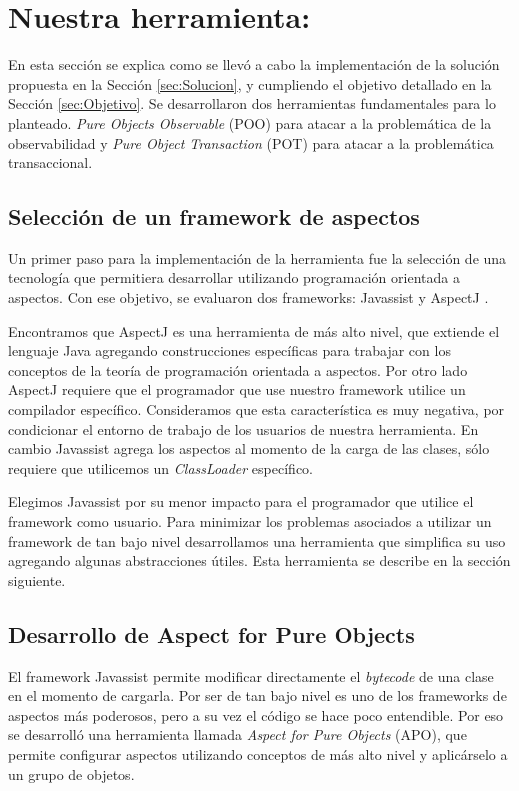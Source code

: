 \section{Nuestra herramienta: }

En esta sección se explica como se llevó a cabo la implementación de la solución
propuesta en la Sección \ref{sec:Solucion}, y cumpliendo el objetivo detallado
en la Sección \ref{sec:Objetivo}. Se desarrollaron dos herramientas
fundamentales para lo planteado. \emph{Pure Objects Observable} (POO) para atacar a la
problemática de la observabilidad y \emph{Pure Object Transaction} (POT) para
atacar a la problemática transaccional.
	
	\subsection{Selección de un framework de aspectos}  
	Un primer paso para la implementación de la herramienta fue la selección de una
	tecnología que permitiera desarrollar utilizando programación orientada a
	aspectos.
	Con ese objetivo, se evaluaron dos frameworks: Javassist \cite{??} y AspectJ
	\cite{KiczalesHHKPG01}.

	\medskip 
	Encontramos que AspectJ es una herramienta de más alto nivel, que extiende
	el lenguaje Java agregando construcciones específicas para trabajar con
	los conceptos de la teoría de programación orientada a aspectos.
	Por otro lado AspectJ requiere que el programador que use nuestro framework
	utilice un compilador específico. Consideramos que esta característica es muy
	negativa, por condicionar el entorno de trabajo de los usuarios de nuestra
	herramienta.
	En cambio Javassist agrega los aspectos al momento de la carga de las clases,
	sólo requiere que utilicemos un \emph{ClassLoader} específico.

	Elegimos Javassist por su menor impacto para el programador que utilice el
	framework como usuario.
	Para minimizar los problemas asociados a utilizar un framework de tan bajo
	nivel desarrollamos una herramienta que simplifica su uso agregando algunas
	abstracciones útiles. Esta herramienta se describe en la sección siguiente.

	\subsection{Desarrollo de Aspect for Pure Objects}

	El framework Javassist permite modificar directamente el \emph{bytecode} de
	una clase en el momento de cargarla.
	Por ser de tan bajo nivel es uno de los frameworks de aspectos más poderosos,
	pero a su vez el código se hace poco entendible.
	Por eso se desarrolló una herramienta llamada \emph{Aspect for Pure Objects} (APO), 
	que permite configurar aspectos utilizando conceptos de más alto nivel y
	aplicárselo a un grupo de objetos.
	
